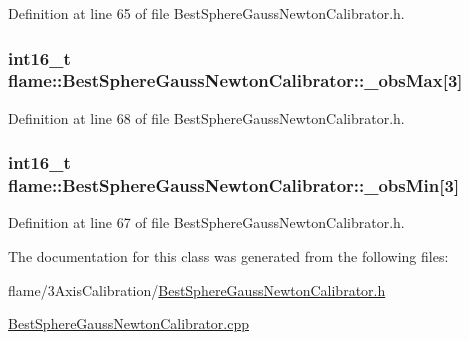Definition at line 65 of file Best\-Sphere\-Gauss\-Newton\-Calibrator.\-h.

\hypertarget{classflame_1_1_best_sphere_gauss_newton_calibrator_afa7171d3e79537e87887b12601c6a3f3}{
\subsubsection[{\-\_\-obs\-Max}]{\setlength{\rightskip}{0pt plus 5cm}int16\-\_\-t flame\-::\-Best\-Sphere\-Gauss\-Newton\-Calibrator\-::\-\_\-obs\-Max\mbox{[}3\mbox{]}\hspace{0.3cm}{\ttfamily [protected]}}}\label{classflame_1_1_best_sphere_gauss_newton_calibrator_afa7171d3e79537e87887b12601c6a3f3}


Definition at line 68 of file Best\-Sphere\-Gauss\-Newton\-Calibrator.\-h.

\hypertarget{classflame_1_1_best_sphere_gauss_newton_calibrator_a557a44d2712689cd6724de99644d762a}{
\subsubsection[{\-\_\-obs\-Min}]{\setlength{\rightskip}{0pt plus 5cm}int16\-\_\-t flame\-::\-Best\-Sphere\-Gauss\-Newton\-Calibrator\-::\-\_\-obs\-Min\mbox{[}3\mbox{]}\hspace{0.3cm}{\ttfamily [protected]}}}\label{classflame_1_1_best_sphere_gauss_newton_calibrator_a557a44d2712689cd6724de99644d762a}


Definition at line 67 of file Best\-Sphere\-Gauss\-Newton\-Calibrator.\-h.



The documentation for this class was generated from the following files\-:\begin{DoxyCompactItemize}
\item 
flame/3\-Axis\-Calibration/\hyperlink{_best_sphere_gauss_newton_calibrator_8h}{Best\-Sphere\-Gauss\-Newton\-Calibrator.\-h}\item 
\hyperlink{_best_sphere_gauss_newton_calibrator_8cpp}{Best\-Sphere\-Gauss\-Newton\-Calibrator.\-cpp}\end{DoxyCompactItemize}
